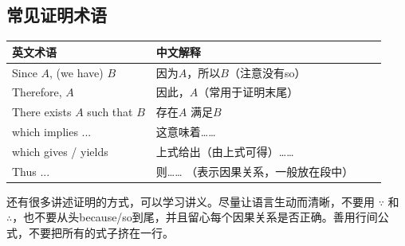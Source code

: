 \documentclass[a4paper,11pt]{article}
\begin{document}
\subsection*{常见证明术语}
\begin{center}
\begin{tabular}{llll}
\hline
\textbf{英文术语} & \textbf{中文解释} \\
\hline
Since $A$, (we have) $B$ & 因为$A$，所以$B$（注意没有so）\\
Therefore, $A$ & 因此，$A$（常用于证明末尾）\\
There exists $A$ such that $B$ & 存在$A$ 满足$B$\\
which implies ... & 这意味着……\\
which gives / yields & 上式给出（由上式可得）……\\
Thus ... & 则…… （表示因果关系，一般放在段中）\\
\hline
\end{tabular}
\end{center}
还有很多讲述证明的方式，可以学习讲义。尽量让语言生动而清晰，不要用 $\because$ 和 $\therefore$，也不要从头because/so到尾，并且留心每个因果关系是否正确。善用行间公式，不要把所有的式子挤在一行。
\end{document}

